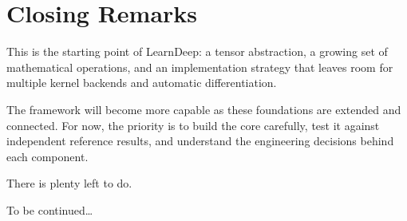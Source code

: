 %

\section{Closing Remarks}

This is the starting point of LearnDeep: a tensor abstraction, a growing set of mathematical operations, and an implementation strategy that leaves room for multiple kernel backends and automatic differentiation.

The framework will become more capable as these foundations are extended and connected. For now, the priority is to build the core carefully, test it against independent reference results, and understand the engineering decisions behind each component.

There is plenty left to do.

To be continued\ldots